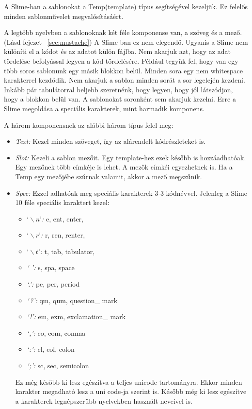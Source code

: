 A Slime-ban a sablonokat a Temp(template) típus segítségével kezeljük. Ez felelős minden sablonművelet megvalósításáért.

A legtöbb nyelvben a sablonoknak két féle komponense van, a szöveg és a mező. (Lásd fejezet ~\ref{sec:mustache})
A Slime-ban ez nem elegendő.
Ugyanis a Slime nem különíti el a kódot és az adatot külön fájlba.
Nem akarjuk azt, hogy az adat tördelése befolyással legyen a kód tördelésére.
Például tegyük fel, hogy van egy több soros sablonunk egy másik blokkon belül.
Minden sora egy nem whitespace karakterrel kezdődik.
Nem akarjuk a sablon minden sorát a sor legelején kezdeni.
Inkább pár tabulátorral beljebb szeretnénk, hogy legyen, hogy jól látszódjon, hogy a blokkon belül van.
A sablonokat soronként sem akarjuk kezelni.
Erre a Slime megoldása a speciális karakterek, mint harmadik komponens.

A három komponensnek az alábbi három típus felel meg:
\begin{itemize}
\item \emph{Text:} 
Kezel minden szöveget, így az alárendelt kódrészleteket is.
\item \emph{Slot:} 
Kezeli a sablon mezőit.
Egy template-hez ezek később is hozzáadhatóak.
Egy mezőnek több címkéje is lehet.
A mezők címkéi egyezhetnek is.
Ha a Temp egy mezőjébe szúrnak valamit, akkor a mező megszűnik. 
\item \emph{Spec:} 
Ezzel adhatóak meg speciális karakterek 3-3 kódnévvel.
Jelenleg a Slime 10 féle speciális karaktert kezel:
\begin{itemize}
\item \emph{\textit{$‘\backslash n’$}:} e, ent, enter, 
\item \emph{\textit{$‘\backslash r’$}:} r, ren, renter, 
\item \emph{\textit{$‘\backslash t’$}:} t, tab, tabulator, 
\item \emph{\textit{‘ ’}:} s, spa, space 
\item \emph{\textit{‘.’}:} pe, per, period 
\item \emph{\textit{‘?’}:} qm, qum, question\_ mark 
\item \emph{\textit{‘!’}:} em, exm, exclamation\_ mark 
\item \emph{\textit{‘,’}:} co, com, comma
\item \emph{\textit{‘:’}:} cl, col, colon 
\item \emph{\textit{‘;’}:} sc, sec, semicolon
\end{itemize}
Ez még később ki lesz egészítva a teljes unicode tartományra. Ekkor minden karakter megadható lesz a uni code-ja szerint is.
Később még ki lesz egészítve a karakterek legnépszerűbb nyelvekben használt neveivel is.
\end{itemize}


